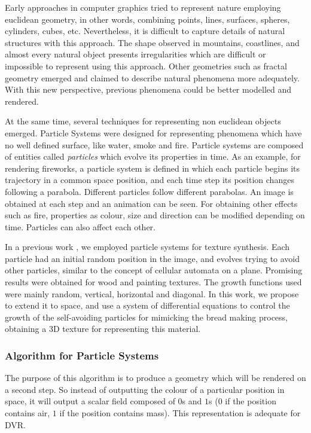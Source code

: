 \documentclass[oneside,a4paper,english,links]{amca}
\begin{document}
Early approaches in computer graphics tried to represent nature employing euclidean geometry, in other words, combining points, lines, surfaces, spheres, cylinders, cubes, etc. Nevertheless, it is difficult to capture details of natural structures with this approach. The shape observed in mountains, coastlines,  and almost every natural object presents irregularities which are difficult or impossible to represent using this approach. Other geometries such as fractal geometry \citep{Mandelbrot83} emerged and claimed to describe natural phenomena more adequately. With this new perspective, previous phenomena could be better modelled and rendered. 

At the same time, several techniques for representing non euclidean objects emerged. Particle Systems \citep{Reeves83} were designed for representing phenomena which have no well defined surface, like water, smoke and fire. Particle systems are composed of entities called {\em particles} which evolve its properties in time. As an example, for rendering fireworks, a particle system is defined in which each particle begins its trajectory in a common space position, and each time step its position changes following a parabola. Different particles follow different parabolas. An image is obtained at each step and an animation can be seen. For obtaining other effects such as fire, properties as colour, size and direction can be modified depending on time. Particles can also affect each other.

In a previous work \citep{Baravalle2011}, we employed particle systems for texture synthesis. Each particle had an initial random position in the image, and evolves trying to avoid other particles, similar to the concept of cellular automata on a plane. Promising results were obtained for wood and painting textures. The growth functions used were mainly random, vertical, horizontal and diagonal. In this work, we propose to extend it to space, and use a system of differential equations to control the growth of the self-avoiding particles for mimicking the bread making process, obtaining a 3D texture for representing this material. 

\subsubsection{Algorithm for Particle Systems}
The purpose of this algorithm is to produce a geometry which will be rendered on a second step. So instead of outputting the colour of a particular position in space, it will output a scalar field composed of $0$s and $1$s ($0$ if the position contains air, $1$ if the position contains mass). This representation is adequate for DVR. 
\end{document}
